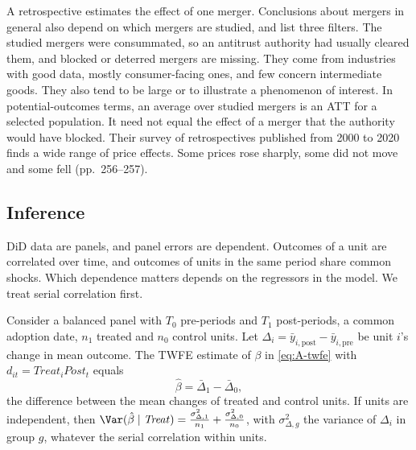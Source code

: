 A retrospective estimates the effect of one merger. Conclusions about mergers in general also depend on which
mergers are studied, and \citet[pp.~255--256]{AskerNocke2021} list three filters. The studied mergers were
consummated, so an antitrust authority had usually cleared them, and blocked or deterred mergers are missing. They
come from industries with good data, mostly consumer-facing ones, and few concern intermediate goods. They also tend
to be large or to illustrate a phenomenon of interest. In potential-outcomes terms, an average over studied mergers is
an ATT for a selected population. It need not equal the effect of a merger that the authority would have blocked.
Their survey of retrospectives published from 2000 to 2020 finds a wide range of price effects. Some prices rose
sharply, some did not move and some fell (pp.~256--257).

\subsection{Inference}\label{sec:A-did-inference}

DiD data are panels, and panel errors are dependent. Outcomes of a unit are correlated over time, and outcomes of
units in the same period share common shocks. Which dependence matters depends on the regressors in the model. We
treat serial correlation first.

\begin{proposition}\label{prop:A-did-collapse}
Consider a balanced panel with $T_0$ pre-periods and $T_1$ post-periods, a common adoption date, $n_1$ treated and
$n_0$ control units. Let $\Delta_i=\bar y_{i,\mathrm{post}}-\bar y_{i,\mathrm{pre}}$ be unit $i$'s change in mean
outcome. The TWFE estimate of $\beta$ in \eqref{eq:A-twfe} with $d_{it}=\mathit{Treat}_i\mathit{Post}_t$ equals
\begin{equation*}
\hat\beta=\bar\Delta_1-\bar\Delta_0,
\end{equation*}
the difference between the mean changes of treated and control units. If units are independent, then
$\Var(\hat\beta\mid\mathit{Treat})=\frac{\sigma_{\Delta,1}^2}{n_1}+\frac{\sigma_{\Delta,0}^2}{n_0}$, with
$\sigma_{\Delta,g}^2$ the variance of $\Delta_i$ in group $g$, whatever the serial correlation within units.
\end{proposition}

